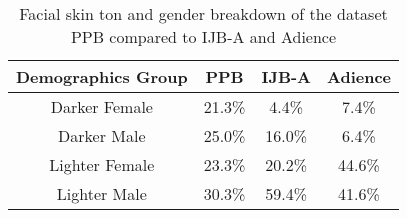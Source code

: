 \begin{table}[b]
    \caption{Facial skin ton and gender breakdown of the dataset PPB compared to IJB-A and Adience}
    \label{skin_ton}
    \centering
    \begin{tabular}{cccc}
        
        \hline
        Demographics Group & PPB & IJB-A & Adience \\
        \hline
        Darker Female & 21.3\% & 4.4\% & 7.4\% \\ 
        Darker Male & 25.0\% & 16.0\% & 6.4\% \\
        Lighter Female & 23.3\% & 20.2\% & 44.6\% \\
        Lighter Male & 30.3\% & 59.4\% & 41.6\% \\       
        \hline
    \end{tabular}
\end{table}
